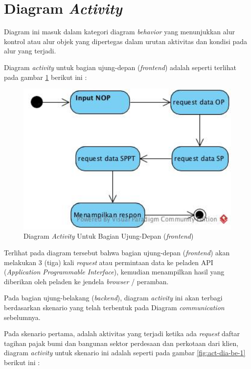 \section{Diagram \textit{Activity}}

Diagram ini masuk dalam kategori diagram \textit{behavior} yang menunjukkan alur kontrol atau alur objek yang dipertegas dalam urutan aktivitas dan kondisi pada alur yang terjadi.

Diagram \textit{activity} untuk bagian ujung-depan (\textit{frontend}) adalah seperti terlihat pada gambar \ref{fig:act-dia-fe} berikut ini :

\begin{figure}[H]
	\centering
	\includegraphics[width=1\textwidth]{./resources/uml/act-dia-fe}
	\caption{Diagram \textit{Activity} Untuk Bagian Ujung-Depan (\textit{frontend})}
	\label{fig:act-dia-fe}
\end{figure}

Terlihat pada diagram tersebut bahwa bagian ujung-depan (\textit{frontend}) akan melakukan 3 (tiga) kali \textit{request} atau permintaan data ke peladen API (\textit{Application Programmable Interface}), kemudian menampilkan hasil yang diberikan oleh peladen ke jendela \textit{browser} / peramban.

Pada bagian ujung-belakang (\textit{backend}), diagram \textit{activity} ini akan terbagi berdasarkan skenario yang telah terbentuk pada Diagram \textit{communication} sebelumnya.

Pada skenario pertama, adalah aktivitas yang terjadi ketika ada \textit{request} daftar tagihan pajak bumi dan bangunan sektor perdesaan dan perkotaan dari klien, diagram \textit{activity} untuk skenario ini adalah seperti pada gambar \ref{fig:act-dia-be-1} berikut ini :

